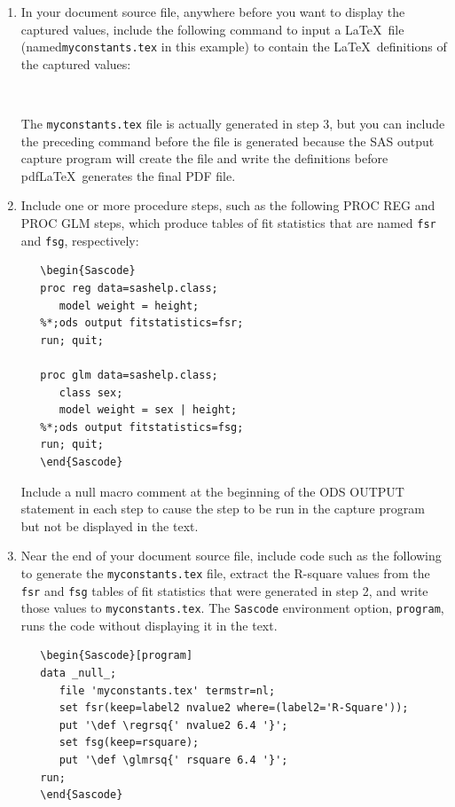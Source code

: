 \documentclass[article,oneside]{memoir}
\begin{document}
\begin{enumerate}
\item In your document source file, anywhere before you want to display the
      captured values, include the following command to
      input a \LaTeX\ file (named\newline\texttt{myconstants.tex} in this example)
      to contain the \LaTeX\ definitions of the captured values:
\begin{snugshade}
\begin{verbatim}
   
\end{verbatim}
\end{snugshade}

The \texttt{myconstants.tex} file is actually generated in step 3,
but you can include the preceding command before the file is generated
because the SAS output capture program will create the file and write
the definitions before pdf\LaTeX\ generates the final PDF file.

\item Include one or more procedure steps, such as the following
      PROC REG and PROC GLM steps, which produce tables of fit statistics
      that are named \texttt{fsr} and \texttt{fsg}, respectively:
\begin{snugshade}
\begin{verbatim}
   \begin{Sascode}
   proc reg data=sashelp.class;
      model weight = height;
   %*;ods output fitstatistics=fsr;
   run; quit;

   proc glm data=sashelp.class;
      class sex;
      model weight = sex | height;
   %*;ods output fitstatistics=fsg;
   run; quit;
   \end{Sascode}
\end{verbatim}
\end{snugshade}

Include a null macro comment at the beginning of the ODS OUTPUT statement
in each step to cause the step to be run in the capture program but not be
displayed in the text.

\item Near the end of your document source file, include code such as the
      following to generate the \texttt{myconstants.tex} file, extract the
      R-square values from the \texttt{fsr} and \texttt{fsg} tables of fit statistics that were
      generated in step 2, and write those values to \texttt{myconstants.tex}.
      The \texttt{Sascode} environment option, \texttt{program},
      runs the code without displaying it in the text.
\begin{snugshade}
\begin{verbatim}
   \begin{Sascode}[program]
   data _null_;
      file 'myconstants.tex' termstr=nl;
      set fsr(keep=label2 nvalue2 where=(label2='R-Square'));
      put '\def \regrsq{' nvalue2 6.4 '}';
      set fsg(keep=rsquare);
      put '\def \glmrsq{' rsquare 6.4 '}';
   run;
   \end{Sascode}
\end{verbatim}
\end{snugshade}


\end{enumerate}
\end{document}
